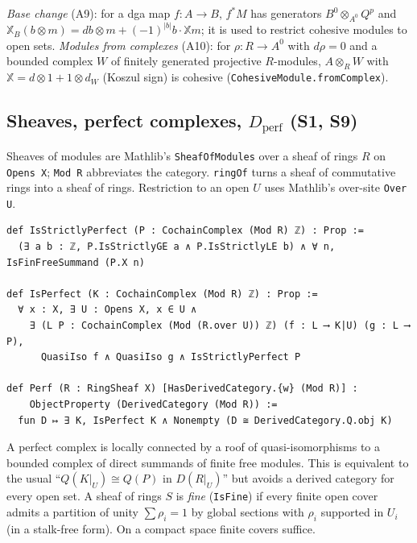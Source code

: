 \emph{Base change} (A9): for a dga map $f\colon A\to B$, $f^*M$ has generators
$B^0\otimes_{A^0}Q^p$ and ${\mathbb{X}}_B(b\otimes m)=db\otimes m+(-1)^{|b|}b\cdot{\mathbb{X}} m$; it is used to
restrict cohesive modules to open sets. \emph{Modules from complexes} (A10): for $\rho\colon R\to
A^0$ with $d\rho=0$ and a bounded complex $W$ of finitely generated projective $R$-modules,
$A\otimes_R W$ with ${\mathbb{X}}=d\otimes1+1\otimes d_W$ (Koszul sign) is cohesive
(\texttt{CohesiveModule.fromComplex}).

\subsection{\texorpdfstring{Sheaves, perfect complexes, ${D_{\mathrm{perf}}}$ (S1, S9)}{Sheaves, perfect complexes, D\_perf (S1, S9)}}\label{sec:perf}
Sheaves of modules are Mathlib's \texttt{SheafOfModules} over a sheaf of rings
$R$ on \texttt{Opens X}; \texttt{Mod R} abbreviates the category. \texttt{ringOf} turns a sheaf of
commutative rings into a sheaf of rings. Restriction to an open $U$ uses Mathlib's over-site
\texttt{Over U}.
\begin{verbatim}
def IsStrictlyPerfect (P : CochainComplex (Mod R) ℤ) : Prop :=
  (∃ a b : ℤ, P.IsStrictlyGE a ∧ P.IsStrictlyLE b) ∧ ∀ n, IsFinFreeSummand (P.X n)

def IsPerfect (K : CochainComplex (Mod R) ℤ) : Prop :=
  ∀ x : X, ∃ U : Opens X, x ∈ U ∧
    ∃ (L P : CochainComplex (Mod (R.over U)) ℤ) (f : L ⟶ K|U) (g : L ⟶ P),
      QuasiIso f ∧ QuasiIso g ∧ IsStrictlyPerfect P

def Perf (R : RingSheaf X) [HasDerivedCategory.{w} (Mod R)] :
    ObjectProperty (DerivedCategory (Mod R)) :=
  fun D ↦ ∃ K, IsPerfect K ∧ Nonempty (D ≅ DerivedCategory.Q.obj K)
\end{verbatim}
A perfect complex is locally connected by a roof of quasi-isomorphisms to a bounded complex of
direct summands of finite free modules. This is equivalent to the usual
``$Q(K|_U)\cong Q(P)$ in $D(R|_U)$'' but avoids a derived category for every open set.
A sheaf of rings $S$ is \emph{fine} (\texttt{IsFine}) if every finite open cover admits a partition
of unity $\sum\rho_i=1$ by global sections with $\rho_i$ supported in $U_i$ (in a stalk-free
form). On a compact space finite covers suffice.

